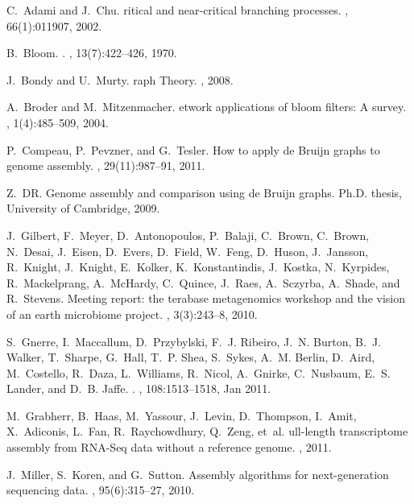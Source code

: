 \documentclass{pnastwo}
\begin{document}
\begin{article}
\begin{thebibliography}{10}
C.~Adami and J.~Chu.
ritical and near-critical branching processes.
, 66(1):011907, 2002.

B.~Bloom.
.
, 13(7):422--426, 1970.

J.~Bondy and U.~Murty.
raph {T}heory.
, 2008.

A.~Broder and M.~Mitzenmacher.
etwork applications of bloom filters: {A} survey.
, 1(4):485--509, 2004.

P.~Compeau, P.~Pevzner, and G.~Tesler.
\newblock How to apply de {B}ruijn graphs to genome assembly.
, 29(11):987--91, 2011.

Z.~DR.
\newblock Genome assembly and comparison using de {B}ruijn graphs.
\newblock Ph.D. thesis, University of Cambridge, 2009.

J.~Gilbert, F.~Meyer, D.~Antonopoulos, P.~Balaji, C.~Brown, C.~Brown, N.~Desai,
  J.~Eisen, D.~Evers, D.~Field, W.~Feng, D.~Huson, J.~Jansson, R.~Knight,
  J.~Knight, E.~Kolker, K.~Konstantindis, J.~Kostka, N.~Kyrpides,
  R.~Mackelprang, A.~McHardy, C.~Quince, J.~Raes, A.~Sczyrba, A.~Shade, and
  R.~Stevens.
\newblock Meeting report: the terabase metagenomics workshop and the vision of
  an earth microbiome project.
, 3(3):243--8, 2010.

S.~Gnerre, I.~Maccallum, D.~Przybylski, F.~J. Ribeiro, J.~N. Burton, B.~J.
  Walker, T.~Sharpe, G.~Hall, T.~P. Shea, S.~Sykes, A.~M. Berlin, D.~Aird,
  M.~Costello, R.~Daza, L.~Williams, R.~Nicol, A.~Gnirke, C.~Nusbaum, E.~S.
  Lander, and D.~B. Jaffe.
.
, 108:1513--1518, Jan 2011.

M.~Grabherr, B.~Haas, M.~Yassour, J.~Levin, D.~Thompson, I.~Amit, X.~Adiconis,
  L.~Fan, R.~Raychowdhury, Q.~Zeng, et~al.
ull-length transcriptome assembly from {R}{N}{A}-{S}eq data
  without a reference genome.
, 2011.

J.~Miller, S.~Koren, and G.~Sutton.
\newblock Assembly algorithms for next-generation sequencing data.
, 95(6):315--27, 2010.


\end{thebibliography}
\end{article}
\end{document}

